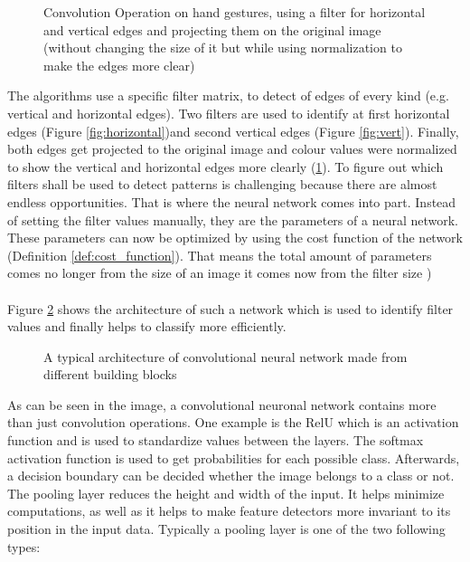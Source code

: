 \begin{figure}[htp]
	\centering
	\caption{Convolution Operation on hand gestures, using a filter for horizontal and vertical edges and projecting them on the original image (without changing the size of it but while using normalization to make the edges more clear)}
	\label{fig:edges}
\end{figure}

The algorithms use a specific filter matrix, to detect of edges of every kind (e.g. vertical and horizontal edges). Two filters are used to identify at first horizontal edges (Figure \ref{fig:horizontal})and second vertical edges (Figure \ref{fig:vert}). Finally, both edges get projected to the original image and colour values were normalized to show the vertical and horizontal edges more clearly (\ref{fig:edges}). To figure out which filters shall be used to detect patterns is challenging because there are almost endless opportunities. That is where the neural network comes into part. Instead of setting the filter values manually, they are the parameters of a neural network. These parameters can now be optimized by using the cost function of the network (Definition \ref{def:cost_function}). That means the total amount of parameters comes no longer from the size of an image it comes now from the filter size \cite{AndrewNG})\\\\

Figure \ref{fig:archi} shows the architecture of such a network which is used to identify filter values  and finally helps 
to classify more efficiently.

\begin{figure}[htp]
	\centering
	\caption{A typical architecture of convolutional neural network made from different building blocks}
	\label{fig:archi}
\end{figure}

As can be seen in the image, a convolutional neuronal network contains more than just convolution operations. One example is the RelU which is an activation function and is used to standardize values between the layers. The softmax activation function is used to get probabilities for each possible class. Afterwards, a decision boundary can be decided whether the image belongs to a class or not. The pooling layer reduces the height and width of the input. It helps minimize computations, as well as it helps to make feature detectors more invariant to its position in the input data. Typically a pooling layer is one of the two following types:

